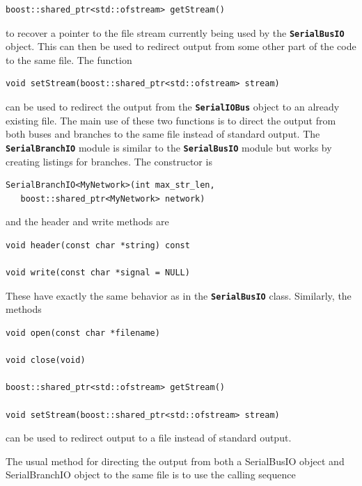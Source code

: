 \documentclass[12pt]{report} %
\begin{document}
{
\color{red}
\begin{Verbatim}[fontseries=b]
boost::shared_ptr<std::ofstream> getStream()
\end{Verbatim}
}

to recover a pointer to the file stream currently being used by the \texttt{\textbf{SerialBusIO}} object. This can then be used to redirect output from some other part of the code to the same file. The function

{
\color{red}
\begin{Verbatim}[fontseries=b]
void setStream(boost::shared_ptr<std::ofstream> stream)
\end{Verbatim}
}

can be used to redirect the output from the \texttt{\textbf{SerialIOBus}} object to an already existing file. The main use of these two functions is to direct the output from both buses and branches to the same file instead of standard output.
The \texttt{\textbf{SerialBranchIO}} module is similar to the \texttt{\textbf{SerialBusIO}} module but works by creating listings for branches. The constructor is

{
\color{red}
\begin{Verbatim}[fontseries=b]
SerialBranchIO<MyNetwork>(int max_str_len,
   boost::shared_ptr<MyNetwork> network)
\end{Verbatim}
}

and the header and write methods are

{
\color{red}
\begin{Verbatim}[fontseries=b]
void header(const char *string) const

void write(const char *signal = NULL)
\end{Verbatim}
}

These have exactly the same behavior as in the \texttt{\textbf{SerialBusIO}} class. Similarly, the methods

{
\color{red}
\begin{Verbatim}[fontseries=b]
void open(const char *filename)

void close(void)

boost::shared_ptr<std::ofstream> getStream()

void setStream(boost::shared_ptr<std::ofstream> stream)
\end{Verbatim}
}

can be used to redirect output to a file instead of standard output.

The usual method for directing the output from both a SerialBusIO object and SerialBranchIO object to the same file is to use the calling sequence
\end{document}
